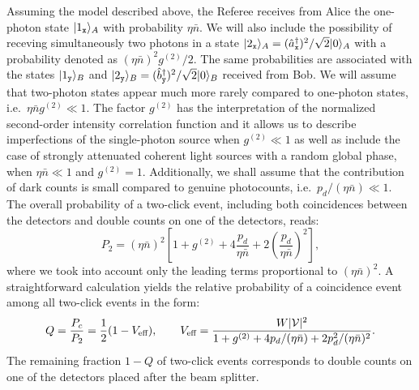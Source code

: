 \documentclass[10pt]{article}
\newcommand{\ket}[2][]{{|#2\rangle_{#1}}}
\begin{document}
Assuming the model described above, the Referee receives from Alice the one-photon state $\ket[A]{1_{\tt x}}$ with probability $\eta\bar{n}$. We will also include the possibility of receving simultaneously two photons in a state $\ket[A]{2_{\tt x}} = (\hat{a}^\dagger_{\tt x})^2 /\sqrt{2} \ket[A]{0}$ with a probability denoted as $(\eta\bar{n})^2 g^{(2)}/2$. The same probabilities are associated with the states $\ket[B]{1_{\tt y}}$ and $\ket[B]{2_{\tt y}}=(\hat{b}^\dagger_{\tt y})^2 /\sqrt{2} \ket[B]{0}$ received from Bob. We will assume that two-photon states appear much more rarely compared to one-photon states, i.e.\ $\eta\bar{n} g^{(2)} \ll 1$. The factor $g^{(2)}$ has the interpretation of the normalized second-order intensity correlation function \cite{Mandel} and it allows us to describe imperfections of the single-photon source when $g^{(2)} \ll 1$ as well as include the case of strongly attenuated coherent light sources with a random global phase, when $\eta\bar{n} \ll 1$ and  $g^{(2)}=1$. Additionally, we shall assume that the contribution of dark counts is small compared to genuine photocounts, i.e.\ $p_d / (\eta\bar{n}) \ll 1$.  The overall probability of a two-click event, including both coincidences between the detectors and double counts on one of the detectors, reads:
\begin{equation}
P_{2}=(\eta\bar{n})^{2}\left[1+g^{(2)}+4\frac{p_{d}}{\eta\bar{n}}+2\left(\frac{p_{d}}{\eta\bar{n}}\right)^{2}\right],
\label{eq:doublecountprob}
\end{equation}
where we took into account only the leading terms proportional to $(\eta\bar{n})^2$. A straightforward calculation yields the relative probability of a coincidence event among all two-click events in the form:
\begin{equation}
 Q=\frac{P_c}{P_2} = \frac{1}{2} (1- V_{\text{eff}}), \qquad V_{\text{eff}} = \frac{W|{\cal V}|^2}{1 + g^{(2)} + 4 p_d/(\eta\bar{n}) + 2 p_d^2/(\eta\bar{n})^2}.
 \label{eq:delta2q}
\end{equation}
The remaining fraction $1-Q$ of two-click events corresponds to double counts on one of the detectors placed after the beam splitter.
\end{document}
